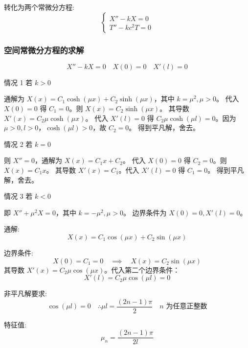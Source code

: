 \documentclass[12pt,a4paper]{article}
\numberwithin{subsection}{section}   %
\numberwithin{subsubsection}{subsection}
\theoremstyle{plain}
\theoremstyle{definition}
\theoremstyle{remark}
\theoremstyle{remark}
\begin{document}
	转化为两个常微分方程:
	\begin{equation} \label{eq:ode_mixed1}
		\begin{cases}
			X'' - kX = 0 \\
			T'' - k c^2 T = 0
		\end{cases}
	\end{equation}
	
	\subsubsection{空间常微分方程的求解}
	\begin{equation}
		X'' - kX = 0 \quad X(0) = 0 \quad X'(l) = 0
	\end{equation}
	
	情况 1 \quad 若 \(k > 0\)
	
	通解为 \(X(x) = C_1 \cosh(\mu x) + C_2 \sinh(\mu x)\)，其中 \(k = \mu^2, \mu>0\)。
	代入 $X(0)=0$ 得 $C_1=0$。则 $X(x) = C_2 \sinh(\mu x)$。
	其导数 $X'(x) = C_2 \mu \cosh(\mu x)$。
	代入 $X'(l)=0$ 得 $C_2 \mu \cosh(\mu l) = 0$。因为 $\mu>0, l>0$，$\cosh(\mu l)>0$，故 $C_2=0$。
	得到平凡解，舍去。
	
	情况 2 \quad 若 \(k = 0\)
	
	则 \(X'' = 0\)，通解为 $X(x) = C_1 x + C_2$。
	代入 $X(0)=0$ 得 $C_2=0$。则 $X(x) = C_1 x$。
	其导数 $X'(x) = C_1$。代入 $X'(l)=0$ 得 $C_1=0$。
	得到平凡解，舍去。
	
	情况 3 \quad 若 \(k < 0\)
	
	即 \(X'' + \mu^2 X = 0\)，其中 \(k = -\mu^2, \mu > 0\)。
	边界条件为 $X(0) = 0, X'(l) = 0$。
	
	通解:
	\begin{equation}
		X(x) = C_1 \cos(\mu x) + C_2 \sin(\mu x)
	\end{equation}
	
	边界条件:
	\begin{equation}
		X(0) = C_1 = 0 \quad \implies \quad X(x) = C_2 \sin(\mu x)
	\end{equation}
	其导数 $X'(x) = C_2 \mu \cos(\mu x)$。代入第二个边界条件：
	\begin{equation}
		X'(l) = C_2 \mu \cos(\mu l) = 0
	\end{equation}
	
	非平凡解要求:
	\begin{equation*}
		\cos(\mu l) = 0 \quad \therefore \mu l = \frac{(2n-1)\pi}{2} \quad n \text{ 为任意正整数}
	\end{equation*}
	
	特征值:
	\begin{equation}
		\mu_n = \frac{(2n-1)\pi}{2l}
	\end{equation}
	
\end{document}
